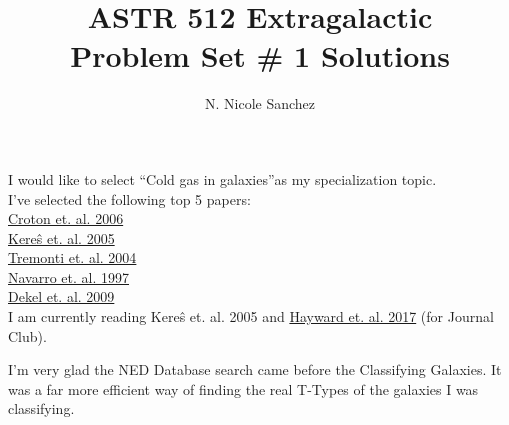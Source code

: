 \documentclass[12pt]{article}
\newcommand\tab[1][1cm]{\hspace*{#1}}
\newenvironment{problem}[2][Problem]{\begin{trivlist}
\item[\hskip \labelsep {\bfseries #1}\hskip \labelsep {\bfseries #2.}]}{\end{trivlist}}
\begin{document}
 
 
\title{ASTR 512 Extragalactic \\ Problem Set \# 1 Solutions}
\author{N. Nicole Sanchez}
\maketitle
 
\begin{problem}{1} 
I would like to select ``Cold gas in galaxies''\tabularnewline as my specialization topic. \\

I've selected the following top 5 papers: \\
\tab \href{http://adsabs.harvard.edu/abs/2006MNRAS.365...11C}{Croton et. al. 2006} \\
\tab \href{http://adsabs.harvard.edu/abs/2005MNRAS.363....2K}{Kere\^s et. al. 2005} \\
\tab \href{http://adsabs.harvard.edu/abs/2004ApJ...613..898T}{Tremonti et. al. 2004} \\ 
\tab \href{http://adsabs.harvard.edu/abs/1997ApJ...490..493N}{Navarro et. al. 1997} \\
\tab \href{https://arxiv.org/pdf/0808.0553.pdf}{Dekel et. al. 2009} \\

I am currently reading Kere\^s et. al. 2005 and \href{https://arxiv.org/pdf/1510.05650.pdf}{Hayward et. al. 2017} (for Journal Club).
\end{problem}
 
\begin{problem}{2}
I'm very glad the NED Database search came before the Classifying Galaxies. It was a far more efficient way of finding the real T-Types of the galaxies I was classifying.
\end{problem}

\pagebreak

\begin{problem}{3}
\end{problem}
\end{document}
